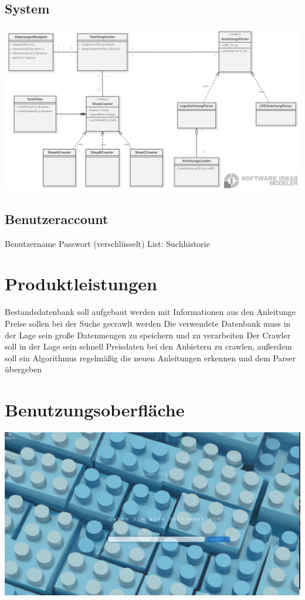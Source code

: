 \subsection{System}
\includegraphics[width=18cm]{pictures/Architektur_Klassendiagramm.png}

\subsection{Benutzeraccount}
Benutzername \newline
Passwort (verschlüsselt) \newline
List: Suchhistorie \newline

\section{Produktleistungen}
Bestandsdatenbank soll aufgebaut werden mit Informationen aus den Anleitunge \newline
Preise sollen bei der Suche gecrawlt werden \newline
Die verwendete Datenbank muss in der Lage sein große Datenmengen zu speichern und zu verarbeiten \newline
Der Crawler soll in der Lage sein schnell Preisdaten bei den Anbietern zu crawlen, außerdem soll ein Algorithmus regelmäßig die neuen Anleitungen erkennen und dem Parser übergeben \newline

\section{Benutzungsoberfläche}
\includegraphics[width=18cm]{pictures/programmvorschau3.png}

